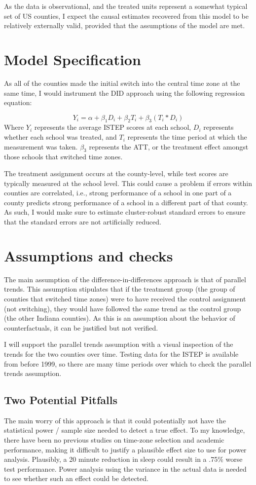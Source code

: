 \documentclass{article}\usepackage[]{graphicx}\usepackage[]{color}
\begin{document}
As the data is observational, and the treated units represent a somewhat typical set of US counties, I expect the causal estimates recovered from this model to be relatively externally valid, provided that the assumptions of the model are met.

\section{Model Specification}

As all of the counties made the initial switch into the central time zone at the same time, I would instrument the DID approach using the following regression equation:

$$Y_i=\alpha + \beta_1D_i + \beta_2T_i + \beta_3(T_i * D_i)$$
Where $Y_i$ represents the average ISTEP scores at each school, $D_i$ represents whether each school was treated, and $T_i$ represents the time period at which the measurement was taken.
$\beta_3$ represents the ATT, or the treatment effect amongst those schools that switched time zones.

The treatment assignment occurs at the county-level, while test scores are typically measured at the school level. This could cause a problem if errors within counties are correlated, i.e., strong performance of a school in one part of a county predicts strong performance of a school in a different part of that county.
As such, I would make sure to estimate cluster-robust standard errors to ensure that the standard errors are not artificially reduced.

\section{Assumptions and checks}
The main assumption of the difference-in-differences approach is that of parallel trends. This assumption stipulates that if the treatment group (the group of counties that switched time zones) were to have received the control assignment (not switching), they would have followed the same trend as the control group (the other Indiana counties).
As this is an assumption about the behavior of counterfactuals, it can be justified but not verified.

I will support the parallel trends assumption with a visual inspection of the trends for the two counties over time. Testing data for the ISTEP is available from before 1999, so there are many time periods over which to check the parallel trends assumption.

\subsection{Two Potential Pitfalls}
The main worry of this approach is that it could potentially not have the statistical power / sample size needed to detect a true effect. To my knowledge, there have been no previous studies on time-zone selection and academic performance, making it difficult to justify a plausible effect size to use for power analysis.
Plausibly, a 20 minute reduction in sleep could result in a .75\% worse test performance.
Power analysis using the variance in the actual data is needed to see whether such an effect could be detected.
\end{document}
